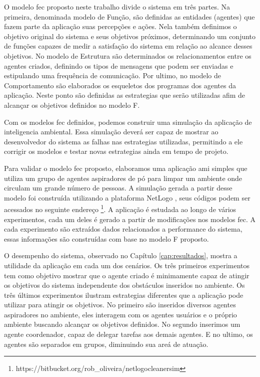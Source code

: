     O modelo \acrshort{fec} proposto neste trabalho divide o sistema em três partes. Na primeira, denominada modelo de Função, são definidas as entidades (agentes) que fazem parte da aplicação suas percepções e ações. Nela também definimos o objetivo original do sistema e seus objetivos próximos, determinando um conjunto de funções capazes de medir a satisfação do sistema em relação ao alcance desses objetivos. No modelo de Estrutura são determinados os relacionamentos entre os agentes criados, definindo os tipos de mensagens que podem ser enviadas e estipulando uma frequência de comunicação. Por ultimo, no modelo de Comportamento são elaborados os esqueletos dos programas dos agentes da aplicação. Neste ponto são definidas as estrategias que serão utilizadas afim de alcançar os objetivos definidos no modelo F. 
    
    Com os modelos \acrshort{fec} definidos, podemos construir uma simulação da aplicação de inteligencia ambiental. Essa simulação deverá ser capaz de mostrar ao desenvolvedor do sistema as falhas nas estrategias utilizadas, permitindo a ele corrigir os modelos e testar novas estrategias ainda em tempo de projeto.  
    
    Para validar o modelo \acrshort{fec} proposto, elaboramos uma aplicação \acrshort{ami} simples que utiliza um grupo de agentes aspiradores de pó para limpar um ambiente onde circulam um grande número de pessoas. A simulação gerada a partir desse modelo foi construída utilizando a plataforma NetLogo \cite{wilensky1999netlogo}, seus códigos podem ser acessados no seguinte endereço \footnote{https://bitbucket.org/rob\_oliveira/netlogocleanersim}. A aplicação é estudada ao longo de vários experimentos, cada um deles é gerado a partir de modificações nos modelos \acrshort{fec}. A cada experimento são extraídos dados relacionados a performance do sistema, essas informações são construídas com base no modelo F proposto. 
    
    O desempenho do sistema, observado no Capítulo \ref{cap:resultados}, mostra a utilidade da aplicação em cada um dos cenários. Os três primeiros experimentos tem como objetivo mostrar que o agente criado é minimamente capaz de atingir os objetivos do sistema independente dos obstáculos inseridos no ambiente. Os três últimos experimentos ilustram estrategias diferentes que a aplicação pode utilizar para atingir os objetivos. No primeiro são inseridos diversos agentes aspiradores no ambiente, eles interagem com os agentes usuários e o próprio ambiente buscando alcançar os objetivos definidos. No segundo inserimos um agente coordenador, capaz de delegar tarefas aos demais agentes. E no ultimo, os agentes são separados em grupos, diminuindo sua areá de atuação. 
    
